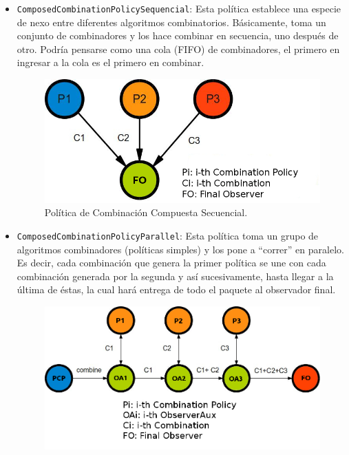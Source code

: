       	\begin{itemize}
	    		\item \texttt{ComposedCombinationPolicySequencial}: Esta pol\'itica establece una especie de nexo entre diferentes algoritmos combinatorios. 
	     			B\'asicamente, toma un conjunto de combinadores y los hace combinar en secuencia, uno despu\'es de otro. Podr\'ia pensarse como una cola 
	     			(FIFO) de combinadores, el primero en ingresar a la cola es el primero en combinar.
	     				\begin{figure}[H]\hspace{.8cm}
	     					\includegraphics[scale=.45]{images/Comb1.jpg}
	     					\caption{Pol\'itica de Combinaci\'on Compuesta Secuencial.}
	     				\end{figure}
            \item \texttt{ComposedCombinationPolicyParallel}\label{composedCombPolicyParallel}: Esta pol\'itica toma un grupo de algoritmos combinadores
              (pol\'iticas simples) y los pone a ``correr'' en paralelo. Es decir, cada combinaci\'on que genera la primer pol\'itica se une con cada
              combinaci\'on generada por la segunda y as\'i sucesivamente, hasta llegar a la \'ultima de \'estas, la cual har\'a entrega de todo el 
              paquete al observador final.
      			\begin{figure}[H]\hspace{.3cm}
	     				\includegraphics[scale=.4]{images/Comb2.jpg}

\end{figure}
\end{itemize}

